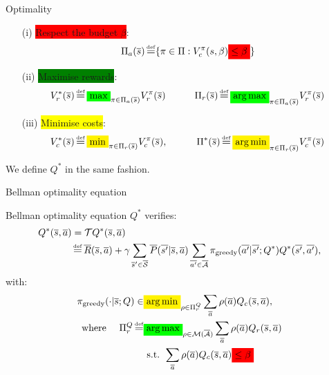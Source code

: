 \documentclass{beamer}
\newcommand{\mathcolorbox}[2]{\colorbox{#1}{$\displaystyle #2$}}
\begin{document}
    \begin{frame}{Optimality}
        \begin{definition}
            \begin{enumerate}
                \item[(i)] \pause\colorbox{red}{Respect the budget $\beta$}:
                \begin{equation*}
                    \Pi_a(\os) \eqdef \{\pi\in\Pi: V_c^\pi(s, \beta) \mathcolorbox{red}{\leq \beta}\}
                \end{equation*}
                \item[(ii)] \pause\colorbox{green}{Maximise rewards}:
                \begin{equation*}
                    V_r^*(\os) \eqdef \mathcolorbox{green}{\max}_{\pi\in\Pi_a(\os)}  V_r^\pi(\os) \qquad\quad \Pi_r(\os) \eqdef \mathcolorbox{green}{\argmax}_{\pi\in\Pi_a(\os)}  V_r^\pi(\os)
                \end{equation*}
                \item[(iii)] \pause\colorbox{yellow}{Minimise costs}:
                \begin{equation*}
                    V_c^*(\os) \eqdef \mathcolorbox{yellow}{\min}_{\pi\in\Pi_r(\os)}  V_c^\pi(\os), \qquad\quad \Pi^*(\os) \eqdef \mathcolorbox{yellow}{\argmin}_{\pi\in\Pi_r(\os)}  V_c^\pi(\os)
                \end{equation*}
            \end{enumerate}

            \pause We define $Q^*$ in the same fashion.
        \end{definition}
    \end{frame}

    \begin{frame}{Bellman optimality equation}
        \begin{block}{Bellman optimality equation}
            $Q^*$ verifies:
            \begin{align*}
                Q^{*}(\os, \oa) &= \cT Q^{*}(\os, \oa)\\
                &\eqdef \ov{R}(\os, \oa) + \gamma \sum_{\os'\in\ocS} \ov{P}(\ov{s'} | \os, \oa)\sum_{\ov{a'}\in \ocA} \pi_\text{greedy}(\ov{a'}|\ov{s'}; Q^*) Q^{*}(\ov{s'}, \ov{a'}),
            \end{align*}
            with:\pause
            \begin{align*}
                \pi_\text{greedy}(\cdot|\os; Q) \in &\mathcolorbox{yellow}{\argmin}_{\rho\in\Pi_r^Q} \sum_{\oa}\rho(\oa) Q_c(\os, \oa), \\
                \text{where }\quad \Pi_r^Q \eqdef &\mathcolorbox{green}{\argmax}_{\rho\in\cM(\ocA)} \sum_{\oa}\rho(\oa) Q_r(\os, \oa) \\
                & \text{ s.t. }   \sum_{\oa}\rho(\oa) Q_c(\os, \oa) \mathcolorbox{red}{\leq \beta}
            \end{align*}
        \end{block}
    \end{frame}
\end{document}
